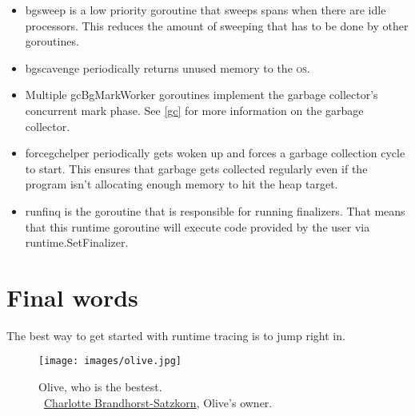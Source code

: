 \documentclass[10pt,letterpaper,oneside,openany,english]{memoir}
\newcommand{\code}[1]{{\ttfamily\mbox{#1}}}
\begin{document}
\begin{itemize}
\item \code{bgsweep} is a low priority goroutine that sweeps spans when there are idle processors. This reduces the amount
  of sweeping that has to be done by other goroutines.
\item \code{bgscavenge} periodically returns unused memory to the \textsc{os}.
\item Multiple \code{gcBgMarkWorker} goroutines implement the garbage collector's concurrent mark phase. See \cref{gc} for more information on the garbage collector.
\item \code{forcegchelper} periodically gets woken up and forces a garbage collection cycle to start.
  This ensures that garbage gets collected regularly even if the program isn't allocating enough memory to hit the heap target.
\item \code{runfinq} is the goroutine that is responsible for running finalizers.
  That means that this runtime goroutine will execute code provided by the user via \code{runtime.SetFinalizer}.
\end{itemize}

\chapter{Final words}

The best way to get started with runtime tracing is to jump right in.
\enlargethispage{3\baselineskip}
\begin{figure}[h!]
  \centering
  \texttt{[image: images/olive.jpg]}
  \caption*{Olive, who is the bestest.\\\textcopyright{}~\href{https://catzkorn.dev/}{Charlotte Brandhorst-Satzkorn}, Olive's owner.}
\end{figure}


\backmatter

\printbibliography
\end{document}

